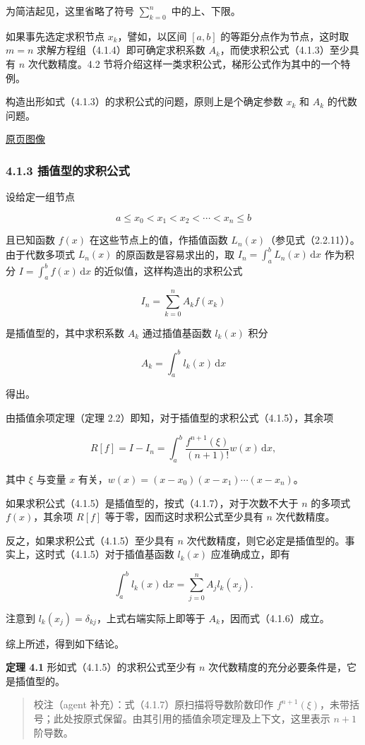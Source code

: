 \documentclass[
  10pt,
  fontset=fandol]{ctexart}
\begin{document}
为简洁起见，这里省略了符号 \(\displaystyle\sum_{k=0}^n\) 中的上、下限。

如果事先选定求积节点 \(x_k\)，譬如，以区间 \([a,b]\) 的等距分点作为节点，这时取 \(m=n\) 求解方程组（4.1.4）即可确定求积系数 \(A_k\)，而使求积公式（4.1.3）至少具有 \(n\) 次代数精度。4.2 节将介绍这样一类求积公式，梯形公式作为其中的一个特例。

构造出形如式（4.1.3）的求积公式的问题，原则上是个确定参数 \(x_k\) 和 \(A_k\) 的代数问题。

\href{../../source-images/pdf-095.jpeg}{原页图像}

\subsubsection{4.1.3 插值型的求积公式}\label{ux63d2ux503cux578bux7684ux6c42ux79efux516cux5f0f}

设给定一组节点

\[
a\leq x_0<x_1<x_2<\cdots<x_n\leq b
\]

且已知函数 \(f(x)\) 在这些节点上的值，作插值函数 \(L_n(x)\)（参见式（2.2.11））。由于代数多项式 \(L_n(x)\) 的原函数是容易求出的，取 \(I_n=\int_a^b L_n(x)\,\mathrm{d}x\) 作为积分 \(I=\int_a^b f(x)\,\mathrm{d}x\) 的近似值，这样构造出的求积公式

\[
I_n=\sum_{k=0}^n A_kf(x_k)
\tag{4.1.5}
\]

是插值型的，其中求积系数 \(A_k\) 通过插值基函数 \(l_k(x)\) 积分

\[
A_k=\int_a^b l_k(x)\,\mathrm{d}x
\tag{4.1.6}
\]

得出。

由插值余项定理（定理 2.2）即知，对于插值型的求积公式（4.1.5），其余项

\[
R[f]=I-I_n=\int_a^b\frac{f^{n+1}(\xi)}{(n+1)!}w(x)\,\mathrm{d}x,
\tag{4.1.7}
\]

其中 \(\xi\) 与变量 \(x\) 有关，\(w(x)=(x-x_0)(x-x_1)\cdots(x-x_n)\)。

如果求积公式（4.1.5）是插值型的，按式（4.1.7），对于次数不大于 \(n\) 的多项式 \(f(x)\)，其余项 \(R[f]\) 等于零，因而这时求积公式至少具有 \(n\) 次代数精度。

反之，如果求积公式（4.1.5）至少具有 \(n\) 次代数精度，则它必定是插值型的。事实上，这时式（4.1.5）对于插值基函数 \(l_k(x)\) 应准确成立，即有

\[
\int_a^b l_k(x)\,\mathrm{d}x=\sum_{j=0}^n A_jl_k(x_j).
\]

注意到 \(l_k(x_j)=\delta_{kj}\)，上式右端实际上即等于 \(A_k\)，因而式（4.1.6）成立。

综上所述，得到如下结论。

\textbf{定理 4.1} 形如式（4.1.5）的求积公式至少有 \(n\) 次代数精度的充分必要条件是，它是插值型的。

\begin{quote}
校注（agent 补充）：式（4.1.7）原扫描将导数阶数印作 \(f^{n+1}(\xi)\)，未带括号；此处按原式保留。由其引用的插值余项定理及上下文，这里表示 \(n+1\) 阶导数。
\end{quote}
\end{document}
